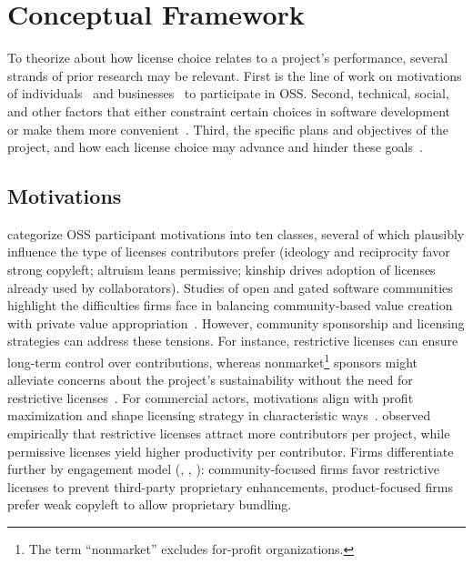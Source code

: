\section{Conceptual Framework}\label{sec:background}

To theorize about how license choice relates to a project's performance,
several strands of prior research may be relevant.
First is the line of work on motivations of
individuals~\cite{von2012carrots} and businesses~\cite{Harhoff02} to
participate in OSS.
Second, technical, social, and other factors
that either constraint certain choices in software development or
make them more convenient~\cite{ma2020methodology}.
Third, the specific plans and objectives of the project, and how each license choice may advance and hinder these goals~\cite{sen2008determinants}.

\subsection{Motivations}

\citet{von2012carrots} categorize OSS participant motivations
into ten classes, several of which plausibly influence the type of
licenses contributors prefer (ideology and reciprocity favor strong
copyleft; altruism leans permissive; kinship drives adoption of
licenses already used by collaborators).
Studies of open and gated software
communities highlight the difficulties firms face in balancing
community-based value creation with private value
appropriation~\cite{Shah06}. However, community sponsorship and
licensing strategies can address these tensions. For instance,
restrictive licenses can ensure long-term control over contributions,
whereas nonmarket\footnote{The term ``nonmarket'' excludes for-profit
organizations.} sponsors might alleviate concerns about the project's
sustainability without the need for restrictive
licenses~\cite{stewart2006impacts}.
For commercial actors, motivations align with profit maximization
and shape licensing strategy in characteristic
ways~\cite{Harhoff02,Shah06,stewart2006impacts}.
\citet{fershtman2007open} observed empirically that restrictive
licenses attract more contributors per project, while permissive
licenses yield higher productivity per contributor.
Firms differentiate further by engagement model
(\citet{dahlander2008firms}, \citet{wagstrom2010impact},
\citet{zhou2016inflow}): community-focused firms favor restrictive
licenses to prevent third-party proprietary enhancements,
product-focused firms prefer weak copyleft to allow proprietary
bundling.

